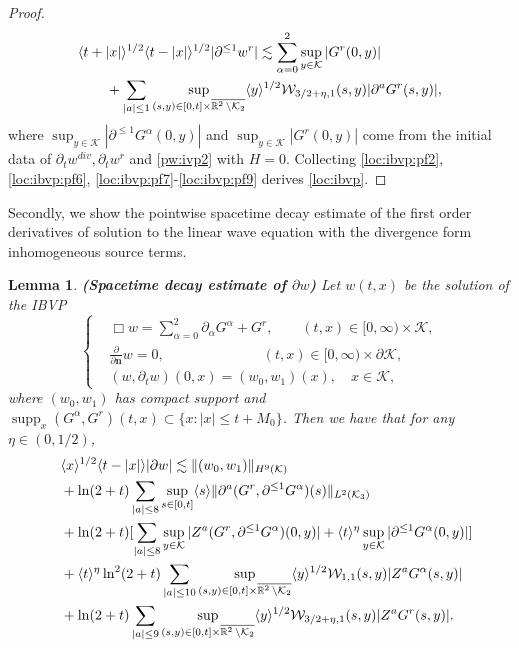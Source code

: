 \documentclass[11pt,twoside]{article}
\def\cK{\mathcal K}
\def\cW{\mathcal W}
\def\R{\mathop{\mathbb R\kern 0pt}\nolimits}
\def\ds{\displaystyle}
\def\supp{\mathop{\rm supp}\nolimits}
\def\p{\partial}
\def\supp{\operatorname{supp}}
\def\ls{\lesssim}
\def\bn{\mathbf{n}}
\newcommand{\w}[1]{\langle {#1} \rangle}
\theoremstyle{plain}
\newtheorem{lemma}[theorem]{Lemma}
\theoremstyle{definition}
\numberwithin{equation}{section}
\begin{document}
\begin{proof}
\begin{equation}
\begin{split}
&\w{t+|x|}^{1/2}\w{t-|x|}^{1/2}|\p^{\le1}w^r|\ls\sum_{\alpha=0}^2\sup_{y\in\cK}|G^r(0,y)|\\
&\qquad+\sum_{|a|\le1}\sup_{(s,y)\in[0,t]\times\overline{\R^2\setminus\cK_2}}\w{y}^{1/2}\cW_{3/2+\eta,1}(s,y)|\p^aG^r(s,y)|,
\end{split}
\end{equation}
where $\ds\sup_{y\in\cK}|\p^{\le1}G^\alpha(0,y)|$ and $\ds\sup_{y\in\cK}|G^r(0,y)|$ come from the initial data of $\p_tw^{div},\p_tw^r$ and \eqref{pw:ivp2} with $H=0$.
Collecting \eqref{loc:ibvp:pf2}, \eqref{loc:ibvp:pf6}, \eqref{loc:ibvp:pf7}-\eqref{loc:ibvp:pf9} derives \eqref{loc:ibvp}.
\end{proof}

Secondly, we show the pointwise spacetime decay estimate of the first order derivatives of solution to the linear wave equation
with the divergence form inhomogeneous source terms.
\begin{lemma}
{\bf (Spacetime decay estimate of $\p w$)}
Let $w(t,x)$ be the solution of the IBVP
\begin{equation*}
\left\{
\begin{aligned}
&\Box w=\sum_{\alpha=0}^2\p_{\alpha}G^\alpha+G^r,\qquad(t,x)\in[0,\infty)\times\cK,\\
&\frac{\p}{\p\bn}w=0,\qquad \quad \qquad\qquad (t,x)\in[0,\infty)\times\p\cK,\\
&(w,\p_tw)(0,x)=(w_0,w_1)(x),\quad x\in\cK,
\end{aligned}
\right.
\end{equation*}
where $(w_0,w_1)$ has compact support and $\supp_x(G^\alpha,G^r)(t,x)\subset\{x: |x|\le t+M_0\}$.
Then we have that for any $\eta\in(0,1/2)$,
\begin{equation}\label{dpw:ibvp}
\begin{split}
&\quad\w{x}^{1/2}\w{t-|x|}|\p w|\ls\|(w_0,w_1)\|_{H^9(\cK)}\\
&\quad+\ln(2+t)\sum_{|a|\le8}\sup_{s\in[0,t]}\w{s}\|\p^a(G^r,\p^{\le1}G^\alpha)(s)\|_{L^2(\cK_3)}\\
&\quad+\ln(2+t)[\sum_{|a|\le8}\sup_{y\in\cK}|Z^a(G^r,\p^{\le1}G^\alpha)(0,y)|+\w{t}^\eta\sup_{y\in\cK}|\p^{\le1}G^\alpha(0,y)|]\\
&\quad+\w{t}^\eta\ln^2(2+t)\sum_{|a|\le10}\sup_{(s,y)\in[0,t]\times\overline{\R^2\setminus\cK_2}}\w{y}^{1/2}\cW_{1,1}(s,y)|Z^aG^\alpha(s,y)|\\
&\quad+\ln(2+t)\sum_{|a|\le9}\sup_{(s,y)\in[0,t]\times\overline{\R^2\setminus\cK_2}}\w{y}^{1/2}\cW_{3/2+\eta,1}(s,y)|Z^aG^r(s,y)|.
\end{split}
\end{equation}
\end{lemma}
\end{document}
